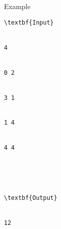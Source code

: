 Example
\begin{verbatim}
\textbf{Input}


4 


0 2 


3 1 


1 4 


4 4 





\textbf{Output}


12\end{verbatim}